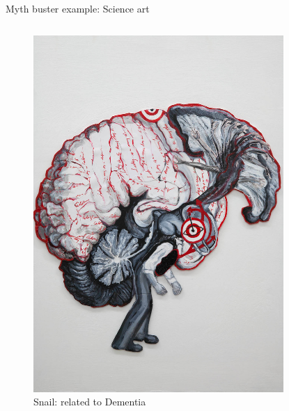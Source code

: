 \begin{frame}[c]{Myth buster example: Science art}
  \begin{columns}
    \begin{column}{0.5\textwidth}
      \begin{figure}[h]
        \centering
        \includegraphics[height=0.6\textheight]{images/rebeccaivatts-dementia.jpg}
        \caption{Snail: related to Dementia}
      \end{figure}
    \end{column}
    \begin{column}{0.5\textwidth}
      \begin{figure}[h]
        \centering

\end{figure}
\end{column}
\end{columns}
\end{frame}
